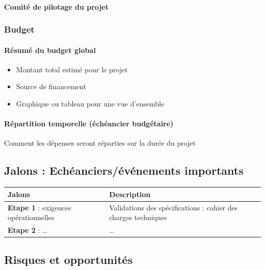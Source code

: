 \paragraph{Comité de pilotage du projet}

\subsubsection{Budget}
\paragraph{Résumé du budget global}
\begin{itemize}
    \item Montant total estimé pour le projet
    \item Source de financement 
    \item Graphique ou tableau pour une vue d'ensemble
\end{itemize}
\paragraph{Répartition temporelle (échéancier budgétaire)}
Comment les dépenses seront réparties sur la durée du projet
\clearpage
\subsection{Jalons : Echéanciers/événements importants}
\begin{table}[!h]
    \centering  
    \begin{tabular}{|p{7cm}|p{7cm}|}  
    \hline  
    \textbf{Jalons} & \textbf{Description}\\
    \hline
    \textbf{Etape 1 }: exigences opérationnelles & Validations des spécifications : cahier des charges techniques\\
    \hline
    \textbf{Etape 2} : \dots & \dots\\
    \hline
    \end{tabular}
\end{table}
\subsection{Risques et opportunités}
